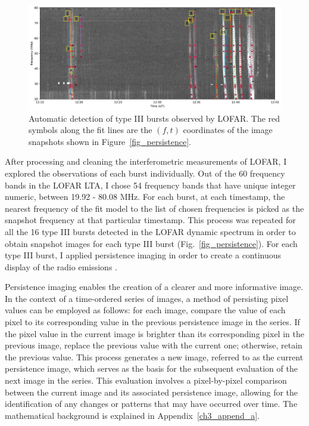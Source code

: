 \begin{figure}[ht]
\centering
\includegraphics[width=\hsize]{chapter3/figs/lofar_dyspec_detect__snapshot_coords.pdf}
\caption{Automatic detection of type III bursts observed by LOFAR. The red symbols along the fit lines are the $(f,t)$ coordinates of the image snapshots shown in Figure~\ref{fig_persistence}.}
\label{lofar_burst_detect}
\end{figure}

After processing and cleaning the interferometric measurements of LOFAR, I explored the observations of each burst individually.
Out of the 60 frequency bands in the LOFAR LTA, I chose 54 frequency bands that have unique integer numeric, between 19.92 - 80.08 MHz.
For each burst, at each timestamp, the nearest frequency of the fit model to the list of chosen frequencies is picked as the snapshot frequency at that particular timestamp.
This process was repeated for all the 16 type III bursts detected in the LOFAR dynamic spectrum in order to obtain snapshot images for each type III burst (Fig.~\ref{fig_persistence}).
For each type III burst, I applied persistence imaging in order to create a continuous display of the radio emissions \citep{thompson_2016}.

Persistence imaging enables the creation of a clearer and more informative image.
In the context of a time-ordered series of images, a method of persisting pixel values can be employed as follows: for each image, compare the value of each pixel to its corresponding value in the previous persistence image in the series. If the pixel value in the current image is brighter than its corresponding pixel in the previous image, replace the previous value with the current one; otherwise, retain the previous value. This process generates a new image, referred to as the current persistence image, which serves as the basis for the subsequent evaluation of the next image in the series. This evaluation involves a pixel-by-pixel comparison between the current image and its associated persistence image, allowing for the identification of any changes or patterns that may have occurred over time. The mathematical background is explained in Appendix~\ref{ch3_append_a}.

